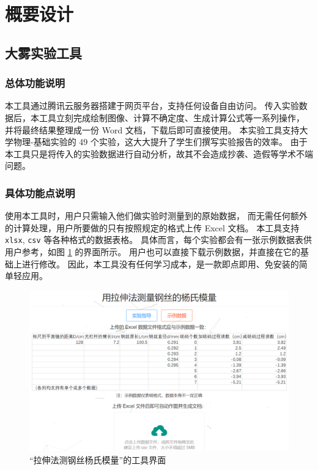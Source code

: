 \section{概要设计}

\subsection{大雾实验工具}

\subsubsection{总体功能说明}

本工具通过腾讯云服务器搭建于网页平台，支持任何设备自由访问。
传入实验数据后，本工具立刻完成绘制图像、计算不确定度、生成计算公式等一系列操作，
并将最终结果整理成一份 Word 文档，下载后即可直接使用。
本实验工具支持大学物理-基础实验的 49 个实验，这大大提升了学生们撰写实验报告的效率。
由于本工具只是将传入的实验数据进行自动分析，故其不会造成抄袭、造假等学术不端问题。

\subsubsection{具体功能点说明}

使用本工具时，用户只需输入他们做实验时测量到的原始数据，
而无需任何额外的计算处理，用户所要做的只有按照规定的格式上传 Excel 文档。
本工具支持 \verb|xlsx|, \verb|csv| 等各种格式的数据表格。
具体而言，每个实验都会有一张示例数据表供用户参考，如图 \ref{fig:interface} 的界面所示。
用户也可以直接下载示例数据，并直接在它的基础上进行修改。
因此，本工具没有任何学习成本，是一款即点即用、免安装的简单轻应用。

\begin{figure}[p]
  \centering
  \includegraphics[width=0.67\columnwidth]{figure/interface.png}
  \caption{“拉伸法测钢丝杨氏模量”的工具界面}
  \label{fig:interface}
\end{figure}

